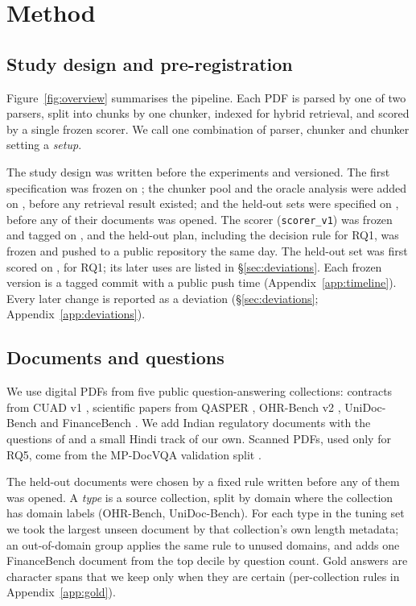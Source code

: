 \section{Method}
\label{sec:method}

\subsection{Study design and pre-registration}
\label{sec:prereg}

Figure~\ref{fig:overview} summarises the pipeline. Each PDF is parsed by
one of two parsers, split into chunks by one chunker, indexed for hybrid
retrieval, and scored by a single frozen scorer. We call one combination
of parser, chunker and chunker setting a \emph{setup}.



The study design was written before the experiments and versioned. The
first specification was frozen on \DateSpecVone{};
the chunker pool and the oracle analysis were added on
\DateSpecVoneOne{}, before any retrieval result existed;
and the held-out sets were specified on \DateSpecVoneTwo{},
before any of their documents was opened. The scorer
(\texttt{scorer\_v1}) was frozen and tagged on \DateScorerFrozen{},
and the held-out plan, including the decision rule for RQ1, was frozen
and pushed to a public repository the same day. The held-out set was
first scored on \DateHeldOutScored{}, for RQ1; its later uses are listed in
\S\ref{sec:deviations}.
Each frozen version is a tagged commit with a public push time
(Appendix~\ref{app:timeline}). Every later change is reported as a
deviation (\S\ref{sec:deviations}; Appendix~\ref{app:deviations}).

\subsection{Documents and questions}
\label{sec:data}

We use digital PDFs from five public question-answering collections:
contracts from CUAD v1 \citep{hendrycks2021cuad}, scientific papers from
QASPER \citep{dasigi2021qasper}, OHR-Bench v2
\citep{zhang2024ocr}, UniDoc-Bench \citep{peng2025unidoc} and
FinanceBench \citep{islam2023financebench}. We add Indian regulatory
documents with the questions of \citet{singh2026parser} and a small Hindi
track of our own. Scanned PDFs, used only for RQ5, come from the
MP-DocVQA validation split \citep{tito2023mpdocvqa}.

The \AccountingHeldOut{} held-out documents were chosen by a fixed rule
written before any of them was opened. A \emph{type} is a source
collection, split by domain where the collection has domain labels
(OHR-Bench, UniDoc-Bench). For each type in the tuning set we took the
largest unseen document by that collection's own length metadata; an
out-of-domain group applies the same rule to unused domains, and adds one
FinanceBench document from the top decile by question count. Gold
answers are character spans that we keep only when they are certain
(per-collection rules in Appendix~\ref{app:gold}).

